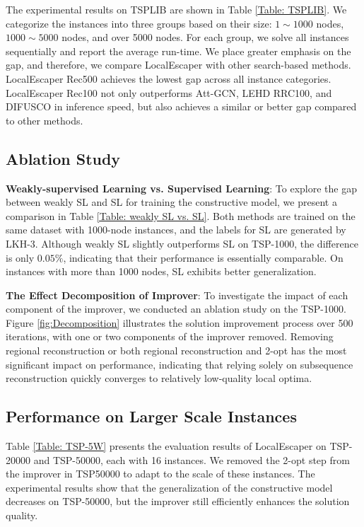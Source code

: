 The experimental results on TSPLIB are shown in Table \ref{Table: TSPLIB}. We categorize the instances into three groups based on their size: $1\sim1000$ nodes, $1000\sim5000$ nodes, and over 5000 nodes. For each group, we solve all instances sequentially and report the average run-time. 
We place greater emphasis on the gap, and therefore, we compare LocalEscaper with other search-based methods. LocalEscaper Rec500 achieves the lowest gap across all instance categories. LocalEscaper Rec100 not only outperforms Att-GCN, LEHD RRC100, and DIFUSCO in inference speed, but also achieves a similar or better gap compared to other methods. 




% 


\subsection{Ablation Study} 
\textbf{Weakly-supervised Learning vs. Supervised Learning}: 
To explore the gap between weakly SL and SL for training the constructive model, we present a comparison in Table \ref{Table: weakly SL vs. SL}. 
Both methods are trained on the same dataset with 1000-node instances, and the labels for SL are generated by LKH-3.  
Although weakly SL slightly outperforms SL on TSP-1000, the difference is only $0.05\%$, indicating that their performance is essentially comparable. On instances with more than 1000 nodes, SL exhibits better generalization.

\textbf{The Effect Decomposition of Improver}: 
To investigate the impact of each component of the improver, we conducted an ablation study on the TSP-1000. 
Figure \ref{fig:Decomposition} illustrates the solution improvement process over 500 iterations, with one or two components of the improver removed. Removing regional reconstruction or both regional reconstruction and 2-opt has the most significant impact on performance, indicating that relying solely on subsequence reconstruction quickly converges to relatively low-quality local optima. 





\subsection{Performance on Larger Scale Instances} 
Table \ref{Table: TSP-5W} presents the evaluation results of LocalEscaper on TSP-20000 and TSP-50000, each with 16 instances. We removed the 2-opt step from the improver in TSP50000 to adapt to the scale of these instances. The experimental results show that the generalization of the constructive model decreases on TSP-50000, but the improver still efficiently enhances the solution quality. 


